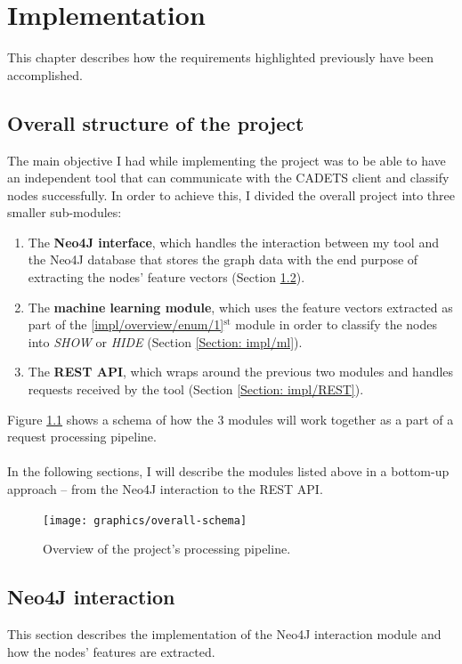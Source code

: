 
	\chapter{Implementation}
	This chapter describes how the requirements highlighted previously have been accomplished. 
	\section{Overall structure of the project} \label{Section: impl/overview}
	The main objective I had while implementing the project was to be able to have an independent tool that can communicate with the CADETS client and classify nodes successfully. In order to achieve this, I divided the overall project into three smaller sub-modules:
	\begin{enumerate}
		\item \label{impl/overview/enum/1} The \textbf{Neo4J interface}, which handles the interaction between my tool and the Neo4J database that stores the graph data with the end purpose of extracting the nodes' feature vectors (Section \ref{Section: impl/neo4j}).
		
		\item The \textbf{machine learning module}, which uses the feature vectors extracted as part of the \ref{impl/overview/enum/1}$^{\text{st}}$ module in order to classify the nodes into \textit{SHOW} or \textit{HIDE} (Section \ref{Section: impl/ml}).
		
		\item The \textbf{REST API}, which wraps around the previous two modules and handles requests received by the tool (Section \ref{Section: impl/REST}).
	\end{enumerate}
	Figure \ref{Fig: impl/pipeline} shows a schema of how the 3 modules will work together as a part of a request processing pipeline. 
	\\ \\
	In the following sections, I will describe the modules listed above in a bottom-up approach -- from the Neo4J interaction to the REST API. 
	\begin{figure}[H]
		\centering
		\texttt{[image: graphics/overall-schema]}	
		\caption[Processing pipeline]{Overview of the project's processing pipeline.}
		\label{Fig: impl/pipeline}
	\end{figure}
	\section{Neo4J interaction} \label{Section: impl/neo4j}
	This section describes the implementation of the Neo4J interaction module and how the nodes' features are extracted. 
